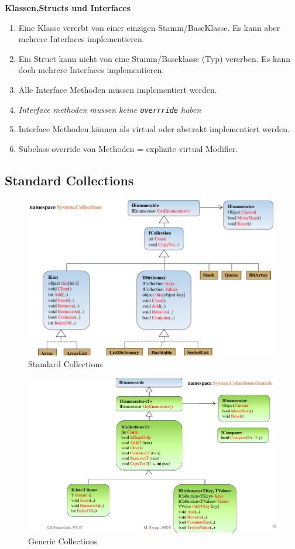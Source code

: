 \documentclass[a4paper,10pt]{scrartcl}
\begin{document}
\textbf{Klassen,Structs und Interfaces}

\begin{enumerate}
 \item Eine Klasse vererbt von einer einzigen Stamm/BaseKlasse. Es kann aber mehrere Interfaces implementieren.
 \item Ein Struct kann nicht von eine Stamm/Baseklasse (Typ) vererben. Es kann doch mehrere Interfaces implementieren.
 \item Alle Interface Methoden müssen implementiert werden.
 \item \textit{Interface methoden mussen keine \texttt{overrride} haben}
 \item Interface Methoden können als virtual oder abstrakt implementiert werden.
 \item Subclass override von Methoden = explizite  virtual Modifier.
\end{enumerate}
\pagebreak
\subsection{Standard Collections}
\begin{figure}[h]
 \centering
 \includegraphics[scale=0.5]{./collections1.png}
 \caption{Standard Collections}
\end{figure}
\begin{figure}[h]
 \centering
 \includegraphics[scale=0.5]{./collections2.png}
 \caption{Generic Collections}
\end{figure}
\end{document}
